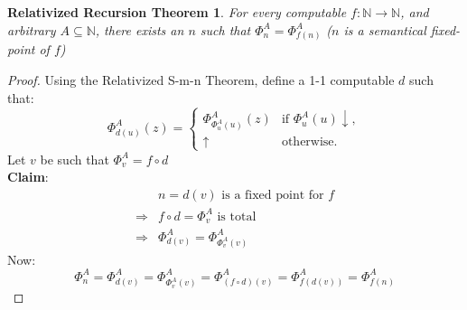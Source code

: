\documentclass[12pt]{article}
\newcommand{\Nat}{\ensuremath{\mathbb{N}}}
\begin{document}
\newtheorem*{relrec}{Relativized Recursion Theorem}
\begin{relrec}
For every computable $f: \Nat \rightarrow \Nat$, 
and arbitrary $A \subseteq \Nat$,
there exists an $n$ such that $\Phi^A_n = \Phi^A_{f(n)}$
	($n$ is a semantical fixed-point of $f$)
\end{relrec}
%
\begin{proof}
Using the Relativized S-m-n Theorem, define a 1-1 computable $d$ such that:
\[
\Phi^A_{d(u)}(z) = \begin{cases}
  \Phi^A_{\Phi^A_u(u)}(z)		&\text{if } \Phi^A_u(u) \downarrow, \\
  \uparrow			&\text{otherwise.}
\end{cases}
\]
Let $v$ be such that $\Phi^A_v = f \circ d$ \\
{\bf Claim}:  
\begin{align*}
  & n = d(v) \text{ is a fixed point for } f \\
  \Rightarrow& f \circ d = \Phi^A_v \text{ is total} \\
  \Rightarrow& \Phi^A_{d(v)} = \Phi^A_{\Phi^A_v(v)}
\end{align*}
Now: \[
\Phi^A_n = \Phi^A_{d(v)} = \Phi^A_{\Phi^A_v(v)} = \Phi^A_{(f \circ d)(v)} = \Phi^A_{f(d(v))} = \Phi^A_{f(n)} 
\]
\end{proof}
\end{document}
